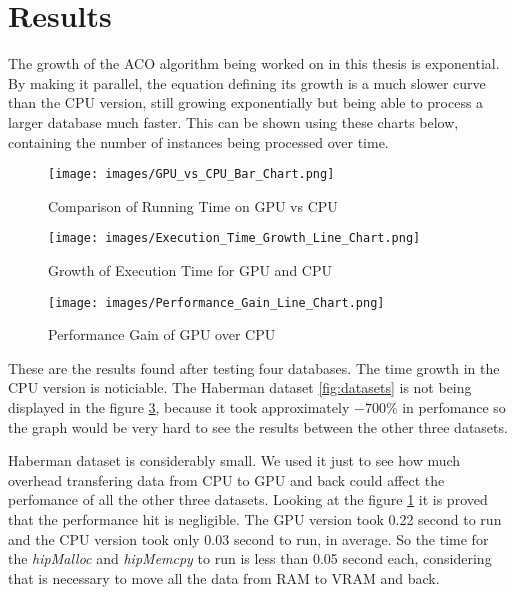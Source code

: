 \section{Results} \label{Results}

The growth of the ACO algorithm being worked on in this thesis is exponential.
By making it parallel, the equation defining its growth is a much slower curve than the CPU version,
still growing exponentially but being able to process a larger database much faster.
This can be shown using these charts below, containing the number of instances being processed over time.

\begin{figure}[ht]
    \centering
    \texttt{[image: images/GPU\_vs\_CPU\_Bar\_Chart.png]}
    \caption{Comparison of Running Time on GPU vs CPU}
    \label{fig:gpu_vs_cpu}
\end{figure}

\begin{figure}[ht]
    \centering
    \texttt{[image: images/Execution\_Time\_Growth\_Line\_Chart.png]}
    \caption{Growth of Execution Time for GPU and CPU}
    \label{fig:execution_time_growth}
\end{figure}

\begin{figure}[ht]
    \centering
    \texttt{[image: images/Performance\_Gain\_Line\_Chart.png]}
    \caption{Performance Gain of GPU over CPU}
    \label{fig:performance_gain}
\end{figure}

These are the results found after testing four databases. The time growth in the CPU version is noticiable.
The Haberman dataset \ref{fig:datasets} is not being displayed in the figure \ref{fig:performance_gain}, because it took approximately $-700\%$
in perfomance so the graph would be very hard to see the results between the other three datasets.

Haberman dataset is considerably small. We used it just to see how much overhead transfering data from CPU to GPU and back
could affect the perfomance of all the other three datasets. Looking at the figure \ref{fig:gpu_vs_cpu} it is proved that
the performance hit is negligible. The GPU version took 0.22 second to run and the CPU version took only
0.03 second to run, in average. So the time for the \emph{hipMalloc} and \emph{hipMemcpy} to run is less than 0.05 second each,
considering that is necessary to move all the data from RAM to VRAM and back.
